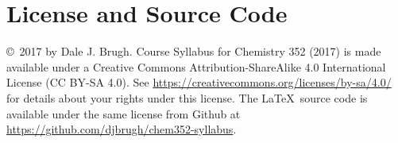 \documentclass[letterpaper,oneside,onecolumn,11pt,article]{memoir}
\begin{document}
\section{License and Source Code}
\copyright\ 2017 by Dale J. Brugh. Course Syllabus for Chemistry 352 (2017) is made available under a Creative Commons Attribution-ShareAlike 4.0 International License (CC BY-SA 4.0). See \href{https://creativecommons.org/licenses/by-sa/4.0/}{https://creativecommons.org/licenses/by-sa/4.0/} for details about your rights under this license. The \LaTeX\ source code is available under the same license from Github at \href{https://github.com/djbrugh/chem352-syllabus}{https://github.com/djbrugh/chem352-syllabus}. 
\end{document}
